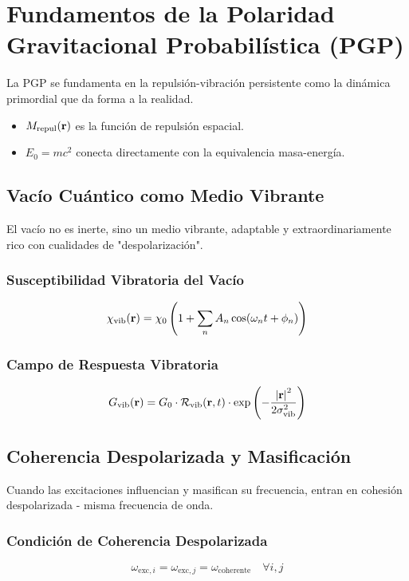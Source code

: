 \documentclass[11pt, a4paper]{article}
\begin{document}
\section{Fundamentos de la Polaridad Gravitacional Probabilística (PGP)}
La PGP se fundamenta en la repulsión-vibración persistente como la dinámica primordial que da forma a la realidad.
\begin{itemize}
    \item \(M_{\text{repul}}(\vb{r})\) es la función de repulsión espacial.
    \item \(E_0 = mc^2\) conecta directamente con la equivalencia masa-energía.
\end{itemize}

\subsection{Vacío Cuántico como Medio Vibrante}
El vacío no es inerte, sino un medio vibrante, adaptable y extraordinariamente rico con cualidades de "despolarización".

\subsubsection{Susceptibilidad Vibratoria del Vacío}
\begin{equation}
\chi_{\text{vib}}(\vb{r}) = \chi_0 \left(1 + \sum_n A_n \cos(\omega_n t + \phi_n)\right)
\end{equation}

\subsubsection{Campo de Respuesta Vibratoria}
\begin{equation}
G_{\text{vib}}(\vb{r}) = G_0 \cdot \mathcal{R}_{\text{vib}}(\vb{r},t) \cdot \exp\left(-\frac{\abs{\vb{r}}^2}{2\sigma_{\text{vib}}^2}\right)
\end{equation}

\subsection{Coherencia Despolarizada y Masificación}
Cuando las excitaciones influencian y masifican su frecuencia, entran en cohesión despolarizada - misma frecuencia de onda.

\subsubsection{Condición de Coherencia Despolarizada}
\begin{equation}
\omega_{\text{exc},i} = \omega_{\text{exc},j} = \omega_{\text{coherente}} \quad \forall i,j
\end{equation}
\end{document}
